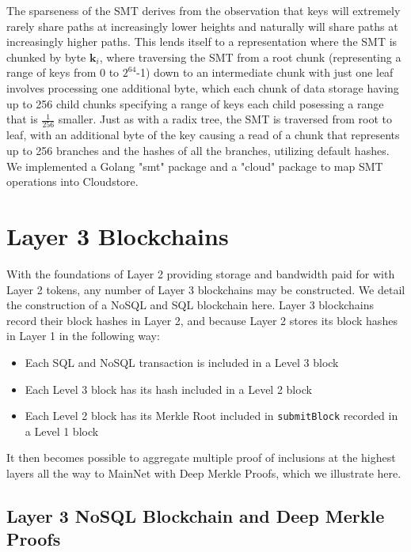 \documentclass{article}
\begin{document}
The sparseness of the SMT derives from the observation that keys will extremely rarely share paths at increasingly lower heights and naturally will share paths at increasingly higher paths.  This lends itself to a representation where the SMT is chunked by byte $\mathbf{k}_i$, where traversing the SMT from a root chunk (representing a range of keys from 0 to $2^{64}$-1) down to an intermediate chunk with just one leaf involves processing one additional byte, which each chunk of data storage having up to 256 child chunks specifying a range of keys each child posessing a range that is $\frac{1}{256}$ smaller.  Just as with a radix tree, the SMT is traversed from root to leaf, with an additional byte of the key causing a read of a chunk that represents up to 256 branches and the hashes of all the branches, utilizing default hashes.  We implemented a Golang "smt" package and a "cloud" package to map SMT operations into Cloudstore.

\section{Layer 3 Blockchains\label{sec:layer3}}

With the foundations of Layer 2 providing storage and bandwidth paid for with Layer 2 tokens, any number of Layer 3 blockchains may be constructed.  We detail the construction of a NoSQL and SQL blockchain here.  Layer 3 blockchains record their block hashes in Layer 2, and because Layer 2 stores its block hashes in Layer 1 in the following way:
\begin{itemize}
 \item Each SQL and NoSQL transaction is included in a Level 3 block
 \item Each Level 3 block has its hash included in a Level 2 block
 \item Each Level 2 block has its Merkle Root included in {\tt submitBlock} recorded in a Level 1 block
\end{itemize}
It then becomes possible to aggregate multiple proof of inclusions at the highest layers all the way to MainNet with Deep Merkle Proofs, which we illustrate here.

\subsection{Layer 3 NoSQL Blockchain and Deep Merkle Proofs}
\end{document}
